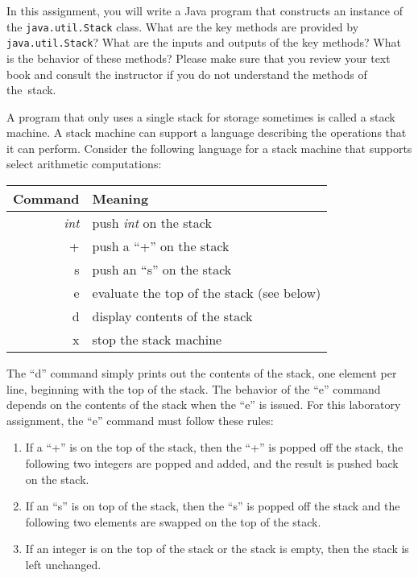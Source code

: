  In this assignment, you will write a Java program that constructs an instance of the {\tt java.util.Stack} class. What
  are the key methods are provided by {\tt java.util.Stack}? What are the inputs and outputs of the key methods? What is
  the behavior of these methods? Please make sure that you review your text book and consult the instructor if you do
  not understand the methods of \mbox{the stack}.
  
  A program that only uses a single stack for storage sometimes is called a stack machine. A stack machine can support a
  language describing the operations that it can perform. Consider the following language for a stack machine that
  supports select arithmetic computations:

\begin{tabular}{r | l}
Command & Meaning \\ \hline
\emph{int} & push \emph{int} on the stack \\
+ & push a ``+'' on the stack \\
s & push an ``s'' on the stack \\
e & evaluate the top of the stack (see below) \\
d & display contents of the stack \\
x & stop the stack machine \\ 
\end{tabular}

  The ``d'' command simply prints out the contents of the stack, one element per line, beginning with the top of the
  stack. The behavior of the ``e'' command depends on the contents of the stack when the ``e'' is issued. For this
  laboratory assignment, the ``e'' command must follow these rules:

\begin{enumerate}

  \item If a ``+'' is on the top of the stack, then the ``+'' is popped off the stack, the following two integers are
    popped and added, and the result is pushed back on the stack.  
  
  \item If an ``s'' is on top of the stack, then the ``s'' is popped off the stack and the following two elements are
    swapped on the top of the stack.  
  
  \item If an integer is on the top of the stack or the stack is empty, then the stack is left unchanged.  

\end{enumerate}

